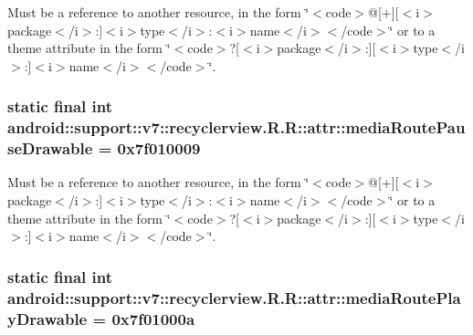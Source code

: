 Must be a reference to another resource, in the form \char`\"{}$<$code$>$@\mbox{[}+\mbox{]}\mbox{[}$<$i$>$package$<$/i$>$:\mbox{]}$<$i$>$type$<$/i$>$:$<$i$>$name$<$/i$>$$<$/code$>$\char`\"{} or to a theme attribute in the form \char`\"{}$<$code$>$?\mbox{[}$<$i$>$package$<$/i$>$:\mbox{]}\mbox{[}$<$i$>$type$<$/i$>$:\mbox{]}$<$i$>$name$<$/i$>$$<$/code$>$\char`\"{}. \hypertarget{classandroid_1_1support_1_1v7_1_1recyclerview_1_1_r_1_1attr_cf3900a35ec057c26c29f798fd22aaf3}{
\subsubsection[{mediaRoutePauseDrawable}]{\setlength{\rightskip}{0pt plus 5cm}static final int android::support::v7::recyclerview.R.R::attr::mediaRoutePauseDrawable = 0x7f010009}}
\label{classandroid_1_1support_1_1v7_1_1recyclerview_1_1_r_1_1attr_cf3900a35ec057c26c29f798fd22aaf3}


Must be a reference to another resource, in the form \char`\"{}$<$code$>$@\mbox{[}+\mbox{]}\mbox{[}$<$i$>$package$<$/i$>$:\mbox{]}$<$i$>$type$<$/i$>$:$<$i$>$name$<$/i$>$$<$/code$>$\char`\"{} or to a theme attribute in the form \char`\"{}$<$code$>$?\mbox{[}$<$i$>$package$<$/i$>$:\mbox{]}\mbox{[}$<$i$>$type$<$/i$>$:\mbox{]}$<$i$>$name$<$/i$>$$<$/code$>$\char`\"{}. \hypertarget{classandroid_1_1support_1_1v7_1_1recyclerview_1_1_r_1_1attr_8b8407b05a1ed86fa52957028ca6aa01}{
\subsubsection[{mediaRoutePlayDrawable}]{\setlength{\rightskip}{0pt plus 5cm}static final int android::support::v7::recyclerview.R.R::attr::mediaRoutePlayDrawable = 0x7f01000a}}
\label{classandroid_1_1support_1_1v7_1_1recyclerview_1_1_r_1_1attr_8b8407b05a1ed86fa52957028ca6aa01}



